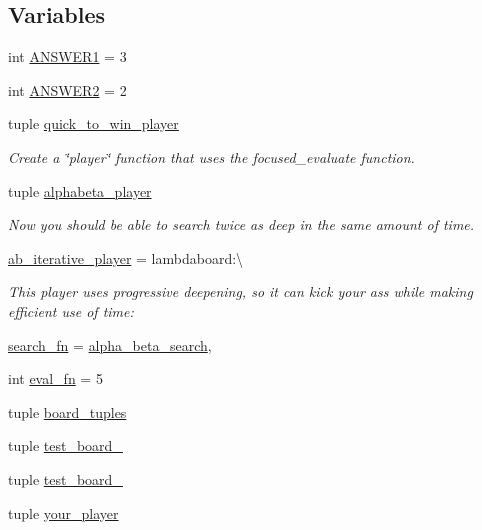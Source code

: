 \subsection*{Variables}
\begin{DoxyCompactItemize}
\item 
int \hyperlink{namespacelab3_ad2e45b0f85fa13d33b881635810e83e8}{A\+N\+S\+W\+E\+R1} = 3
\item 
int \hyperlink{namespacelab3_a988f22c9cf01e9e09a7df386ff76a739}{A\+N\+S\+W\+E\+R2} = 2
\item 
tuple \hyperlink{namespacelab3_aa43b2937a5bad423a493276473384d9a}{quick\+\_\+to\+\_\+win\+\_\+player}
\begin{DoxyCompactList}\small\item\em Create a \char`\"{}player\char`\"{} function that uses the focused\+\_\+evaluate function. \end{DoxyCompactList}\item 
tuple \hyperlink{namespacelab3_aa4790555a33d7ee8155ff4358799617a}{alphabeta\+\_\+player}
\begin{DoxyCompactList}\small\item\em Now you should be able to search twice as deep in the same amount of time. \end{DoxyCompactList}\item 
\hyperlink{namespacelab3_a38ce81786d974fadcf07d456d1576153}{ab\+\_\+iterative\+\_\+player} = lambdaboard\+:\textbackslash{}
\begin{DoxyCompactList}\small\item\em This player uses progressive deepening, so it can kick your ass while making efficient use of time\+: \end{DoxyCompactList}\item 
\hyperlink{namespacelab3_abc5335867f83db21385d992f00825e22}{search\+\_\+fn} = \hyperlink{namespacelab3_a7ead0dd82f5946316600e9a937e55037}{alpha\+\_\+beta\+\_\+search},
\item 
int \hyperlink{namespacelab3_aef5722d14d422222f997cff6cd66564f}{eval\+\_\+fn} = 5
\item 
tuple \hyperlink{namespacelab3_af72a06890c8de2fae05fc82044aa76be}{board\+\_\+tuples}
\item 
tuple \hyperlink{namespacelab3_a7c477dab1b106f5495518ad07afa5a16}{test\+\_\+board\+\_}
\item 
tuple \hyperlink{namespacelab3_a0cf494dec1c4e8b319a04e3b8b967cf3}{test\+\_\+board\+\_}
\item 
tuple \hyperlink{namespacelab3_abb9fde36d4d3f3fbe09a1bcc9e70a8df}{your\+\_\+player}

\end{DoxyCompactItemize}
